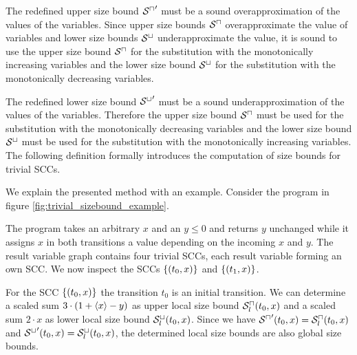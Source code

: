 The redefined upper size bound ${{\mathcal{S}^\sqcap}}'$ must be a sound overapproximation of the values of the variables.
Since upper size bounds ${\mathcal{S}^\sqcap}$ overapproximate the value of variables and lower size bounds ${\mathcal{S}^\sqcup}$ underapproximate the value, it is sound to use the upper size bound ${\mathcal{S}^\sqcap}$ for the substitution with the monotonically increasing variables and the lower size bound ${\mathcal{S}^\sqcup}$ for the substitution with the monotonically decreasing variables.

The redefined lower size bound ${{\mathcal{S}^\sqcup}}'$ must be a sound underapproximation of the values of the variables.
Therefore the upper size bound ${\mathcal{S}^\sqcap}$ must be used for the substitution with the monotonically decreasing variables and the lower size bound ${\mathcal{S}^\sqcup}$ must be used for the substitution with the monotonically increasing variables.
The following definition formally introduces the computation of size bounds for trivial SCCs.



We explain the presented method with an example.
Consider the program in figure \ref{fig:trivial_sizebound_example}.



The program takes an arbitrary $x$ and an $y \leq 0$ and returns $y$ unchanged while it assigns $x$ in both transitions a value depending on the incoming $x$ and $y$.
The result variable graph contains four trivial SCCs, each result variable forming an own SCC.
We now inspect the SCCs $\lbrace (t_0,x) \rbrace$ and $\lbrace (t_1,x) \rbrace$.

For the SCC $\lbrace (t_0,x) \rbrace$ the transition $t_0$ is an initial transition.
We can determine a scaled sum $3 \cdot (1 + \langle x\rangle - y)$ as upper local size bound ${\mathcal{S}^\sqcap_l}(t_0,x)$ and a scaled sum $2 \cdot x$ as lower local size bound ${\mathcal{S}^\sqcup_l}(t_0,x)$.
Since we have ${\mathcal{S}^\sqcap}'(t_0,x) = {\mathcal{S}^\sqcap_l}(t_0,x)$ and ${\mathcal{S}^\sqcup}'(t_0,x) = {\mathcal{S}^\sqcup_l}(t_0,x)$, the determined local size bounds are also global size bounds.


